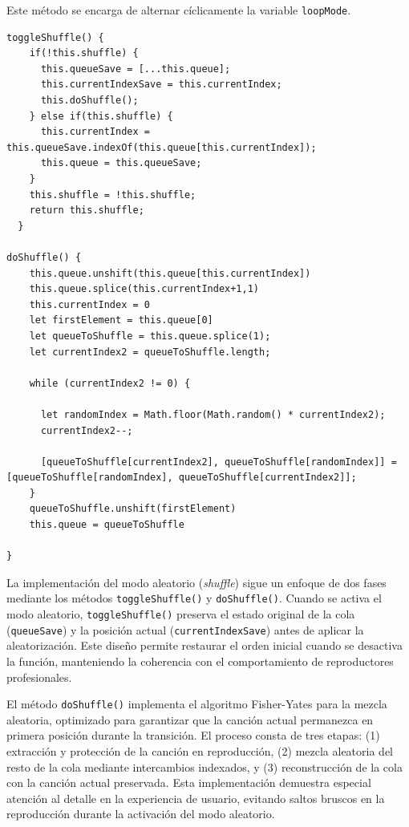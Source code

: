 \documentclass[11pt, a4paper]{article}
\begin{document}
                Este método se encarga de alternar cíclicamente la variable \verb|loopMode|.

                \begin{lstlisting}[caption={Shuffle}]
toggleShuffle() {
    if(!this.shuffle) {
      this.queueSave = [...this.queue];
      this.currentIndexSave = this.currentIndex;
      this.doShuffle();
    } else if(this.shuffle) {
      this.currentIndex = this.queueSave.indexOf(this.queue[this.currentIndex]);
      this.queue = this.queueSave;
    }
    this.shuffle = !this.shuffle;
    return this.shuffle;
  }

doShuffle() {
    this.queue.unshift(this.queue[this.currentIndex])
    this.queue.splice(this.currentIndex+1,1)
    this.currentIndex = 0
    let firstElement = this.queue[0]
    let queueToShuffle = this.queue.splice(1);
    let currentIndex2 = queueToShuffle.length;

    while (currentIndex2 != 0) {

      let randomIndex = Math.floor(Math.random() * currentIndex2);
      currentIndex2--;

      [queueToShuffle[currentIndex2], queueToShuffle[randomIndex]] = [queueToShuffle[randomIndex], queueToShuffle[currentIndex2]];
    }
    queueToShuffle.unshift(firstElement)
    this.queue = queueToShuffle
    
}
                \end{lstlisting}

                La implementación del modo aleatorio (\textit{shuffle}) sigue un enfoque de dos fases mediante los métodos \verb|toggleShuffle()| y \verb|doShuffle()|. Cuando se activa el modo aleatorio, \verb|toggleShuffle()| preserva el estado original de la cola (\verb|queueSave|) y la posición actual (\verb|currentIndexSave|) antes de aplicar la aleatorización. Este diseño permite restaurar el orden inicial cuando se desactiva la función, manteniendo la coherencia con el comportamiento de reproductores profesionales.

                El método \verb|doShuffle()| implementa el algoritmo Fisher-Yates para la mezcla aleatoria, optimizado para garantizar que la canción actual permanezca en primera posición durante la transición. El proceso consta de tres etapas: (1) extracción y protección de la canción en reproducción, (2) mezcla aleatoria del resto de la cola mediante intercambios indexados, y (3) reconstrucción de la cola con la canción actual preservada. Esta implementación demuestra especial atención al detalle en la experiencia de usuario, evitando saltos bruscos en la reproducción durante la activación del modo aleatorio.
\end{document}
